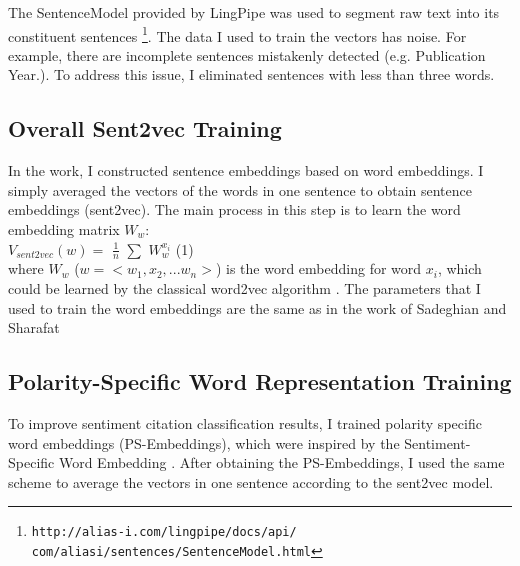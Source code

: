 \documentclass[11pt]{llncs}
\begin{document}
The SentenceModel provided by LingPipe was used to segment raw text into its constituent sentences \footnote{\footnotesize{\tt http://alias-i.com/lingpipe/docs/api/\\com/aliasi/sentences/SentenceModel.html}}. 
The data I used to train the vectors has noise. For example, there are incomplete sentences mistakenly detected (e.g. Publication Year.). To address this issue, I eliminated sentences with less than three words.
 
 
\subsection{Overall Sent2vec Training}\label{sec:word2vectraining}
In the  work, I constructed sentence embeddings based on word embeddings. I simply averaged the vectors of the words in one sentence to obtain sentence embeddings (sent2vec). The main process in this step is to learn the word embedding matrix $W_{w}$:\\

{$V_{sent2vec}(w) = $ $\frac{1}{n}$ $\sum$ $W^{x_{i}}_{w}$} (1)\\

where $W_{w}$ ($w = <w_{1},x_{2},...w_{n}>$) is the word embedding for word $x_{i}$, which could be learned by the classical word2vec algorithm \cite{mikolov2013efficient}. The parameters that I used to train the word embeddings are the same as in the work of Sadeghian and Sharafat 


\subsection{Polarity-Specific Word Representation Training}\label{sec:specword2vectraining}

To improve sentiment citation classification results, I trained polarity specific word embeddings (PS-Embeddings), which were inspired by the Sentiment-Specific Word Embedding \cite{tang2014learning}. After obtaining the PS-Embeddings, I used the same scheme to average the vectors in one sentence according to the  sent2vec model.
\end{document}
